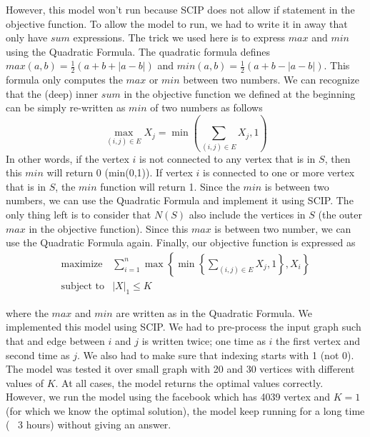 However, this model won't run because SCIP does not allow if statement in the objective function. To allow the model to run, we had to write it in away that only have $sum$ expressions. The trick we used here is to express $max$ and $min$ using the Quadratic Formula. The quadratic formula defines $max(a,b)= \frac{1}{2}\left(a+b + |a-b| \right)$ and $min(a,b)= \frac{1}{2}\left(a+b - |a-b| \right)$. This formula only computes the $max$ or $min$ between two numbers. We can recognize that the  (deep) inner $sum$ in the objective function we defined at the beginning can be simply re-written as $min$ of two numbers as follows
$$
\max_{(i,j)\in E}X_j = \min(\sum_{(i,j)\in E} X_j ,1)
$$
In other words, if the vertex $i$ is not connected to any vertex that is in $S$, then this $min$ will return 0 (min(0,1)). If vertex $i$ is connected to one or more vertex that is in $S$, the $min$ function will return 1. Since the $min$ is between two numbers, we can use the Quadratic Formula and implement it using SCIP. The only thing left is to consider that $N(S)$ also include the vertices in $S$ (the outer $max$ in the objective function). Since this $max$ is between two number, we can use the Quadratic Formula again. Finally, our objective function is expressed as
\mathcenter
\[
\begin{array}{cl}
\text{maximize} &  \sum_{i=1}^{n} \max \left\lbrace  \min\left\lbrace   \sum_{(i,j)\in E}X_j ,1 \right\rbrace,  X_{i}\right\rbrace\\
\text{subject to} & |X|_{1} \leq K
\end{array} 
\]

where the $max$ and $min$ are written as in the Quadratic Formula. We implemented this model using SCIP. We had to pre-process the input graph such that and edge between $i$ and $j$ is written twice; one time as $i$ the first vertex and second time as $j$. We also had to make sure that indexing starts with 1 (not 0). The model was tested it over small graph with 20 and 30 vertices with different values of $K$. At all cases, the model returns the optimal values correctly. However, we run the model using the facebook which has 4039 vertex and $K=1$ (for which we know the optimal solution), the model keep running for a long time (~ 3 hours) without giving an answer. 



